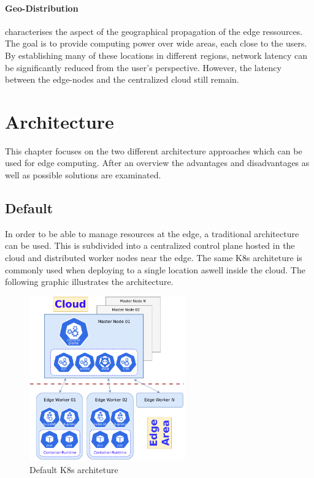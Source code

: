 \documentclass[MSC,Master,english]{twbook}%
\begin{document}
\paragraph{Geo-Distribution} characterises the aspect of the geographical propagation of the edge ressources. The goal is to provide computing power over wide areas, each close to the users. By establishing many of these locations in different regions, network latency can be significantly reduced from the user's perspective. However, the latency between the edge-nodes and the centralized cloud still remain.


\section{Architecture}
\label{sec:architecture}
This chapter focuses on the two different architecture approaches which can be used for edge computing. After an overview the advantages and disadvantages as well as possible solutions are examinated.

\subsection{Default}
\label{sec:arch-default}
In order to be able to manage resources at the edge, a traditional architecture can be used. This is subdivided into a centralized control plane hosted in the cloud and distributed worker nodes near the edge. The same \ac{K8s} architeture is commonly used when deploying to a single location aswell inside the cloud. The following graphic illustrates the architecture.

\begin{figure}[ht]
    \centering
    \includegraphics[width=0.60\textwidth]{PICs/drawio/defaul-k8s.drawio.pdf}
    \caption{Default \ac{K8s} architeture}
    \label{fig:k8s-default}
\end{figure}
\end{document}
